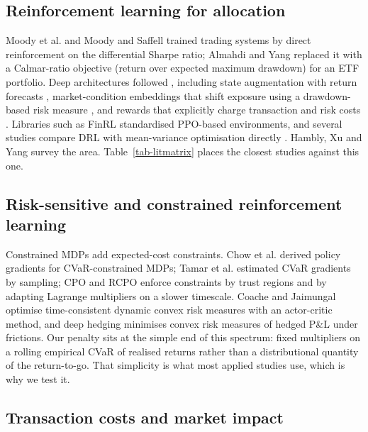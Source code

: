\documentclass[11pt]{article}
\begin{document}
\subsection{Reinforcement learning for allocation}\label{reinforcement-learning-for-allocation}

Moody et al. \cite{r12} and Moody and Saffell \cite{r13} trained trading systems by direct reinforcement on the differential Sharpe ratio; Almahdi and Yang \cite{r47} replaced it with a Calmar-ratio objective (return over expected maximum drawdown) for an ETF portfolio. Deep architectures followed \cite{r14,r15,r16}, including state augmentation with return forecasts \cite{r48}, market-condition embeddings that shift exposure using a drawdown-based risk measure \cite{r49}, and rewards that explicitly charge transaction and risk costs \cite{r50}. Libraries such as FinRL \cite{r17} standardised PPO-based \cite{r18} environments, and several studies compare DRL with mean-variance optimisation directly \cite{r51,r52}. Hambly, Xu and Yang \cite{r53} survey the area. Table~\ref{tab-litmatrix} places the closest studies against this one.

\subsection{Risk-sensitive and constrained reinforcement learning}\label{risk-sensitive-and-constrained-reinforcement-learning}

Constrained MDPs \cite{r24} add expected-cost constraints. Chow et al. \cite{r21} derived policy gradients for CVaR-constrained MDPs; Tamar et al. \cite{r20} estimated CVaR gradients by sampling; CPO \cite{r22} and RCPO \cite{r23} enforce constraints by trust regions and by adapting Lagrange multipliers on a slower timescale. Coache and Jaimungal \cite{r54} optimise time-consistent dynamic convex risk measures with an actor-critic method, and deep hedging \cite{r41} minimises convex risk measures of hedged P\&L under frictions. Our penalty sits at the simple end of this spectrum: fixed multipliers on a rolling empirical CVaR of realised returns rather than a distributional quantity of the return-to-go. That simplicity is what most applied studies use, which is why we test it.

\subsection{Transaction costs and market impact}\label{transaction-costs-and-market-impact}
\end{document}
